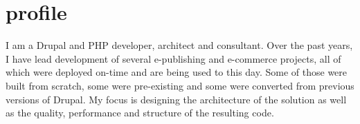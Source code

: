 \documentclass[]{friggeri-cv} %
\begin{document}
    \section{profile}
    I am a Drupal and PHP developer, architect and consultant.
    Over the past years, I have lead development of several e-publishing and e-commerce projects, all of which were deployed on-time and are being used to this day.
    Some of those were built from scratch, some were pre-existing and some were converted from previous versions of Drupal.
    My focus is designing the architecture of the solution as well as the quality, performance and structure of the resulting code.


    \bigskip
\end{document}

